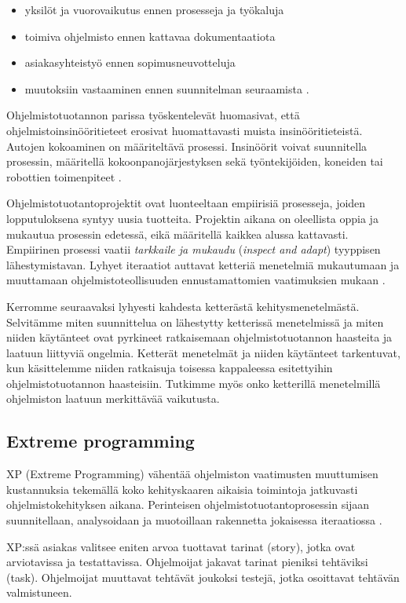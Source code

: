 \documentclass[finnish]{tktltiki2}
\theoremstyle{definition}
\theoremstyle{remark}
\begin{document}
\begin{itemize}
 \item yksilöt ja vuorovaikutus ennen prosesseja ja työkaluja
 \item toimiva ohjelmisto ennen kattavaa dokumentaatiota
 \item asiakasyhteistyö ennen sopimusneuvotteluja
 \item muutoksiin vastaaminen ennen suunnitelman seuraamista \cite{WIC03}.
\end{itemize}

Ohjelmistotuotannon parissa työskentelevät huomasivat, että ohjelmistoinsinööritieteet erosivat huomattavasti muista insinööritieteistä. Autojen kokoaminen on määriteltävä prosessi. Insinöörit voivat suunnitella prosessin, määritellä kokoonpanojärjestyksen sekä työntekijöiden, koneiden tai robottien toimenpiteet \cite{WIC03}.

Ohjelmistotuotantoprojektit ovat luonteeltaan empiirisiä prosesseja, joiden lopputuloksena syntyy uusia tuotteita. Projektin aikana on oleellista oppia ja mukautua prosessin edetessä, eikä määritellä kaikkea alussa kattavasti. Empiirinen prosessi vaatii \textit{tarkkaile ja mukaudu} (\textit{inspect and adapt}) tyyppisen lähestymistavan. Lyhyet iteraatiot auttavat ketteriä menetelmiä mukautumaan ja muuttamaan ohjelmistoteollisuuden ennustamattomien vaatimuksien mukaan \cite{WIC03}.

Kerromme seuraavaksi lyhyesti kahdesta ketterästä kehitysmenetelmästä. Selvitämme miten suunnittelua on lähestytty ketterissä menetelmissä ja miten niiden käytänteet ovat pyrkineet ratkaisemaan ohjelmistotuotannon haasteita ja laatuun liittyviä ongelmia. Ketterät menetelmät ja niiden käytänteet tarkentuvat, kun käsittelemme niiden ratkaisuja toisessa kappaleessa esitettyihin ohjelmistotuotannon haasteisiin. Tutkimme myös onko ketterillä menetelmillä ohjelmiston laatuun merkittävää vaikutusta.

\subsection{Extreme programming}

XP (Extreme Programming) vähentää ohjelmiston vaatimusten muuttumisen kustannuksia tekemällä koko kehityskaaren aikaisia toimintoja jatkuvasti ohjelmistokehityksen aikana. Perinteisen ohjelmistotuotantoprosessin sijaan suunnitellaan, analysoidaan ja muotoillaan rakennetta jokaisessa iteraatiossa \cite{BEC99}.

XP:ssä asiakas valitsee eniten arvoa tuottavat tarinat (story), jotka ovat arviotavissa ja testattavissa. Ohjelmoijat jakavat tarinat pieniksi tehtäviksi (task). Ohjelmoijat muuttavat tehtävät joukoksi testejä, jotka osoittavat tehtävän valmistuneen. 
\end{document}
